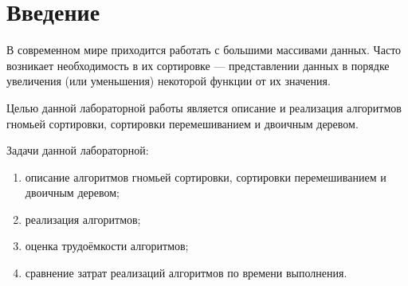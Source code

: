 \chapter*{Введение}

В современном мире приходится работать с большими массивами данных. Часто возникает необходимость в их сортировке --- представлении данных в порядке увеличения (или уменьшения) некоторой функции от их значения.

Целью данной лабораторной работы является описание и реализация алгоритмов гномьей сортировки, сортировки перемешиванием и двоичным деревом.

Задачи данной лабораторной:
\begin{enumerate}
	\item описание алгоритмов гномьей сортировки, сортировки перемешиванием и двоичным деревом;
	\item реализация алгоритмов;
	\item оценка трудоёмкости алгоритмов;
	\item сравнение затрат реализаций  алгоритмов по времени выполнения.
\end{enumerate}
